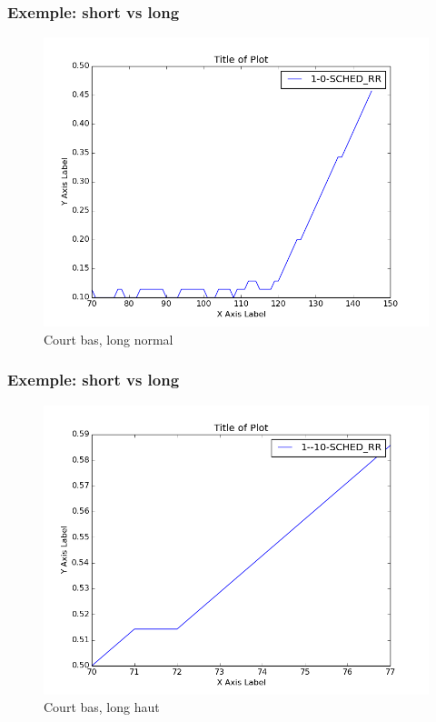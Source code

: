 \documentclass{beamer}
\begin{document}
\begin{frame}
    \frametitle{Exemple: short vs long}

    \begin{center}
        \begin{figure}
            \includegraphics[scale=0.3]{../../short_vs_long/figures/1-0-SCHED_RR.png}
            \caption{Court bas, long normal}
        \end{figure}
    \end{center}
\end{frame}

\begin{frame}
    \frametitle{Exemple: short vs long}

    \begin{center}
        \begin{figure}
            \includegraphics[scale=0.3]{../../short_vs_long/figures/1--10-SCHED_RR}
            \caption{Court bas, long haut}
        \end{figure}
    \end{center}
\end{frame}
\end{document}
